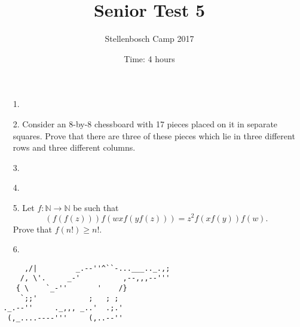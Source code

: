 \documentclass[12pt]{article}
\title{Senior Test 5}
\author{Stellenbosch Camp 2017}
\date{Time: 4 hours}
\begin{document}
 \maketitle

\begin{enumerate}

\item[1.] %


\item[2.] %
Consider an 8-by-8 chessboard with 17 pieces placed on it in separate squares. Prove that there are three of these pieces which lie in three different rows and three different columns.


\item[3.] %


\item[4.] %
 

\item[5.] %
Let $f : \mathbb{N} \to \mathbb{N}$ be such that
  \[ (f(f(z))) f(wx f(y f(z))) = z^2 f(xf(y)) f(w) .\]
Prove that $f(n!) \geq n!$.


\item[6.] %


\end{enumerate}

\vfill

\centering
\begin{BVerbatim}
      ,/|         _.--''^``-...___.._.,;
     /, \'.     _-'          ,--,,,--'''
    { \    `_-''       '    /}
     `;;'            ;   ; ;
 ._.--''     ._,,, _..'  .;.'
  (,_....----'''     (,..--''
\end{BVerbatim}
\end{document}
